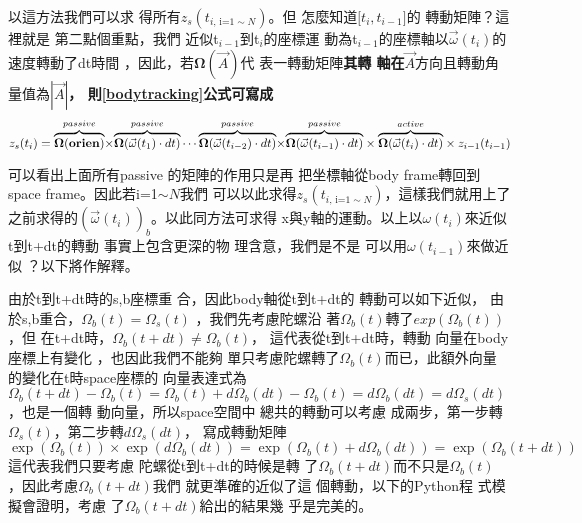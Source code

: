 \documentclass[12pt,a4paper]{article}
\begin{document}
以這方法我們可以求%
得所有$z_{s}(t_{i\text{, i=1}\sim N})$。但%
怎麼知道$\mathbf{[}t_{i},t_{i-1}\mathbf{]}$的%
轉動矩陣？這裡就是%
第二點個重點，我們%
近似t$_{i-1}$到t$_{i}$的座標運%
動為t$_{i-1}$的座標軸以$\vec{\omega%
}(t_{i})$的速度轉動了dt時間%
，因此，若$\mathbf{\Omega }(\vec{A})$代%
表一轉動矩陣\textbf{其轉%
軸在}$\vec{A}$方向且轉動角%
量值為$\left\vert \vec{A}\right\vert $\textbf{，%
則\ref{bodytracking}公式可寫成}%
\begin{equation}
z_{s}(t_{i})=\overset{passive}{\overbrace{\mathbf{\Omega (orien)}}}\mathbf{%
\times }\overset{passive}{\overbrace{\mathbf{\Omega }(\vec{\omega}%
(t_{1})\cdot dt)}}\cdots \overset{passive}{\overbrace{\mathbf{\Omega }(\vec{%
\omega}(t_{i-2})\cdot dt)}}\mathbf{\times }\overset{passive}{\overbrace{%
\mathbf{\Omega }(\vec{\omega}(t_{i-1})\cdot dt)}}\times \overset{active}{%
\overbrace{\mathbf{\Omega }(\vec{\omega}(t_{i})\cdot dt)}}\times
z_{i-1}(t_{i-1})
\end{equation}%
\bigskip

可以看出上面所有passive%
的矩陣的作用只是再%
把坐標軸從body frame轉回到%
space frame。因此若i=1$\sim N$我們%
可以以此求得$z_{s}(t_{i\text{, i=1}\sim
N})$，這樣我們就用上了%
之前求得的$\left( \vec{\omega}(t_{i})\right)
_{b}$。以此同方法可求得%
x與y軸的運動。以上以$%
\omega (t_{i})$來近似t到t+dt的轉動%
事實上包含更深的物%
理含意，我們是不是%
可以用$\omega (t_{i-1})$來做近似%
？以下將作解釋。

由於t到t+dt時的s,b座標重%
合，因此body軸從t到t+dt的%
轉動可以如下近似，%
由於s,b重合，$\Omega _{b}(t)=\Omega _{s}(t)$%
，我們先考慮陀螺沿%
著$\Omega _{b}(t)$轉了$exp(\Omega _{b}(t))$，但%
在t+dt時，$\Omega _{b}(t+dt)\neq \Omega _{b}(t)$，%
這代表從t到t+dt時，轉動%
向量在body座標上有變化%
，也因此我們不能夠%
單只考慮陀螺轉了$\Omega
_{b}(t)$而已，此額外向量%
的變化在t時space座標的%
向量表達式為$\Omega _{b}(t+dt)-\Omega
_{b}(t)=\Omega _{b}(t)+d\Omega _{b}(dt)-\Omega _{b}(t)=d\Omega
_{b}(dt)=d\Omega _{s}(dt)$，也是一個轉%
動向量，所以space空間中%
總共的轉動可以考慮%
成兩步，第一步轉$\Omega
_{s}(t)$，第二步轉$d\Omega _{s}(dt)$，%
寫成轉動矩陣%
\begin{equation}
\exp (\Omega _{b}(t))\times \exp (d\Omega _{b}(dt))=\exp (\Omega
_{b}(t)+d\Omega _{b}(dt))=\exp (\Omega _{b}(t+dt))
\end{equation}%
這代表我們只要考慮%
陀螺從t到t+dt的時候是轉%
了$\Omega _{b}(t+dt)$而不只是$\Omega _{b}(t)$%
，因此考慮$\Omega _{b}(t+dt)$我們%
就更準確的近似了這%
個轉動，以下的Python程%
式模擬會證明，考慮%
了$\Omega _{b}(t+dt)$給出的結果幾%
乎是完美的。
\end{document}

